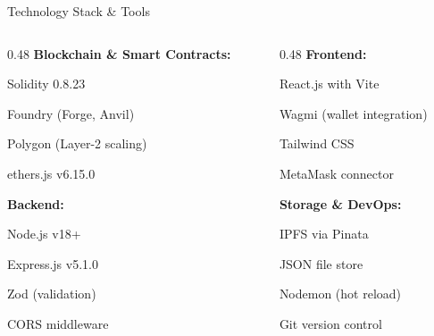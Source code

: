 \documentclass[10pt]{beamer}
\let\olditemize\itemize
\let\endolditemize\enditemize
\renewenvironment{itemize}
  {\olditemize\justifying}
  {\endolditemize}
\begin{document}
\begin{frame}{Technology Stack \& Tools}
\begin{columns}[T]
\begin{column}{0.48\textwidth}
\textbf{Blockchain \& Smart Contracts:}
\begin{itemize}
\item Solidity 0.8.23
\item Foundry (Forge, Anvil)
\item Polygon (Layer-2 scaling)
\item ethers.js v6.15.0
\end{itemize}

\vspace{0.3cm}
\textbf{Backend:}
\begin{itemize}
\item Node.js v18+
\item Express.js v5.1.0
\item Zod (validation)
\item CORS middleware
\end{itemize}
\end{column}

\begin{column}{0.48\textwidth}
\textbf{Frontend:}
\begin{itemize}
\item React.js with Vite
\item Wagmi (wallet integration)
\item Tailwind CSS
\item MetaMask connector
\end{itemize}

\vspace{0.3cm}
\textbf{Storage \& DevOps:}
\begin{itemize}
\item IPFS via Pinata
\item JSON file store
\item Nodemon (hot reload)
\item Git version control
\end{itemize}
\end{column}
\end{columns}
\end{frame}
\end{document}
